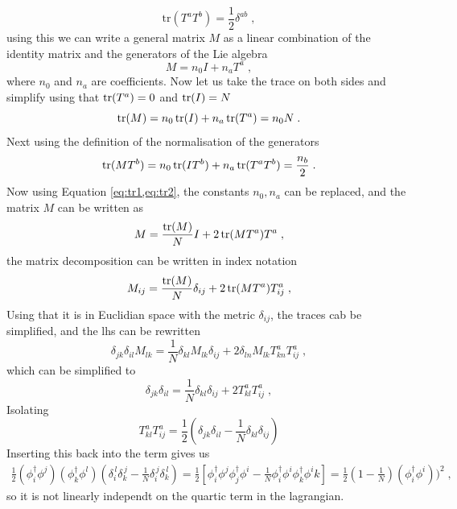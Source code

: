 \begin{equation}
      \text{tr}(T^a T^b)=\frac{1}{2}\delta^{ab}\;,
\end{equation}
using this we can write a general matrix $M$ as a linear combination of the identity matrix and the generators of the Lie algebra
\begin{equation}
      M=n_0 I+n_aT^a\;,
\end{equation}
where $n_0$ and $n_a$ are coefficients. Now let us take the trace on both sides and simplify using that $\operatorname{tr}(T^a)=0$ and $\operatorname{tr}(I)=N$
\begin{equation}
      \operatorname{tr}(M)=n_0 \operatorname{tr}(I)+n_a\operatorname{tr}(T^a)=n_0N\;.\label{eq:tr1}
\end{equation}
Next using the definition of the normalisation of the generators
\begin{equation}
      \operatorname{tr}(MT^b)=n_0 \operatorname{tr}(IT^b)+n_a\operatorname{tr}(T^aT^b)=\frac{n_b}{2}\;.\label{eq:tr2}
\end{equation}
Now using Equation \ref{eq:tr1,eq:tr2}, the constants $n_0,n_a$ can be replaced, and the matrix $M$ can be written as
\begin{equation}
      M=\frac{\operatorname{tr}(M)}{N} I+2\operatorname{tr}(MT^a)T^a\;,
\end{equation}
the matrix decomposition can be written in index notation
\begin{equation}
      M_{ij}=\frac{\operatorname{tr}(M)}{N} \delta_{ij}+2\operatorname{tr}(MT^a)T^a_{ij}\;,
\end{equation}
Using that it is in Euclidian space with the metric $\delta_{ij}$, the traces cab be simplified, and the lhs can be rewritten
\begin{equation}
      \delta_{jk}\delta_{il}M_{lk}=\frac{1}{N} \delta_{kl}M_{lk}\delta_{ij}+2\delta_{ln}M_{lk}T^a_{kn}T^a_{ij}\;,
\end{equation}
which can be simplified to 
\begin{equation}
      \delta_{jk}\delta_{il}=\frac{1}{N} \delta_{kl}\delta_{ij}+2T^a_{kl}T^a_{ij}\;,
\end{equation}
Isolating 
\begin{equation}
      T^a_{kl}T^a_{ij}=\frac{1}{2}\left(\delta_{jk}\delta_{il}-\frac{1}{N} \delta_{kl}\delta_{ij}\right)
\end{equation}
Inserting this back into the term gives us
\begin{align}
    \frac{1}{2} (\phi_i^\dagger \phi^j)(\phi_k^\dagger \phi^l)\left(\delta_i^{\,l}\delta_k^{\,j}-\frac{1}{N}\delta_i^{\,j}\delta_k^{\,l}\right)=\frac{1}{2}\left[\phi^{\dagger}_i \phi^j \phi^{\dagger}_j \phi^i-\frac{1}{N}\phi^{\dagger}_i \phi^i \phi^{\dagger}_k \phi^ik\right]=\frac{1}{2}\left(1-\frac{1}{N}\right) (\phi^{\dagger}_i \phi^i))^2\;,
\end{align}
so it is not linearly independt on the quartic term in the lagrangian. 
